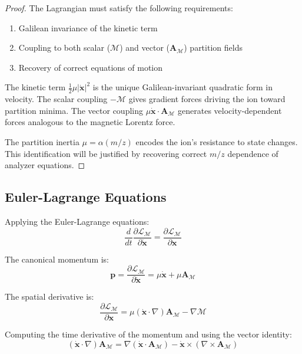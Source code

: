 \documentclass[twocolumn,10pt,a4paper]{article}
\theoremstyle{definition}
\theoremstyle{remark}
\newcommand{\Mdepth}{\mathcal{M}}
\newcommand{\Lagr}{\mathcal{L}}
\newcommand{\Apartition}{\mathbf{A}_{\mathcal{M}}}
\newcommand{\partinert}{\mu}
\begin{document}
\begin{proof}
The Lagrangian must satisfy the following requirements:
\begin{enumerate}
    \item Galilean invariance of the kinetic term
    \item Coupling to both scalar ($\Mdepth$) and vector ($\Apartition$) partition fields
    \item Recovery of correct equations of motion
\end{enumerate}

The kinetic term $\frac{1}{2}\partinert|\dot{\mathbf{x}}|^2$ is the unique Galilean-invariant quadratic form in velocity. The scalar coupling $-\Mdepth$ gives gradient forces driving the ion toward partition minima. The vector coupling $\partinert\dot{\mathbf{x}}\cdot\Apartition$ generates velocity-dependent forces analogous to the magnetic Lorentz force.

The partition inertia $\partinert = \alpha(m/z)$ encodes the ion's resistance to state changes. This identification will be justified by recovering correct $m/z$ dependence of analyzer equations.
\end{proof}

\subsection{Euler-Lagrange Equations}

Applying the Euler-Lagrange equations:
\begin{equation}
    \frac{d}{dt}\frac{\partial \Lagr_{\Mdepth}}{\partial \dot{\mathbf{x}}} = \frac{\partial \Lagr_{\Mdepth}}{\partial \mathbf{x}}
    \label{eq:euler_lagrange}
\end{equation}

The canonical momentum is:
\begin{equation}
    \mathbf{p} = \frac{\partial \Lagr_{\Mdepth}}{\partial \dot{\mathbf{x}}} = \partinert\dot{\mathbf{x}} + \partinert\Apartition
    \label{eq:canonical_momentum}
\end{equation}

The spatial derivative is:
\begin{equation}
    \frac{\partial \Lagr_{\Mdepth}}{\partial \mathbf{x}} = \partinert(\dot{\mathbf{x}} \cdot \nabla)\Apartition - \nabla\Mdepth
    \label{eq:spatial_derivative}
\end{equation}

Computing the time derivative of the momentum and using the vector identity:
\begin{equation}
    (\dot{\mathbf{x}} \cdot \nabla)\Apartition = \nabla(\dot{\mathbf{x}} \cdot \Apartition) - \dot{\mathbf{x}} \times (\nabla \times \Apartition)
\end{equation}
\end{document}
